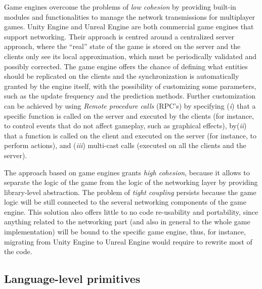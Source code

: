 Game engines overcome the problems of \textit{low cohesion} by providing built-in modules and functionalities to manage the network transmissions for multiplayer games. Unity Engine \cite{engine9unity} and Unreal Engine \cite{games2006unreal} are both commercial game engines that support networking. Their approach is centred around a centralized server approach, where the ``real'' state of the game is stored on the server and the clients only see its local approximation, which must be periodically validated and possibly corrected. The game engine offers the chance of defining what entities should be replicated on the clients and the synchronization is automatically granted by the engine itself, with the possibility of customizing some parameters, such as the update frequency and the prediction methods. Further customization can be achieved by using \textit{Remote procedure calls} (RPC's) by specifying (\textit{i}) that a specific function is called on the server and executed by the clients (for instance, to control events that do not affect gameplay, such as graphical effects), by(\textit{ii}) that a function is called on the client and executed on the server (for instance, to perform actions), and (\textit{iii}) multi-cast calls (executed on all the clients and the server).

The approach based on game engines grants \textit{high cohesion}, because it allows to separate the logic of the game from the logic of the networking layer by providing library-level abstraction. The problem of \textit{tight coupling} persists because the game logic will be still connected to the several networking components of the game engine. This solution also offers little to no code re-usability and portability, since anything related to the networking part (and also in general to the whole game implementation) will be bound to the specific game engine, thus, for instance, migrating from Unity Engine to Unreal Engine would require to rewrite most of the code.

\subsection{Language-level primitives}

